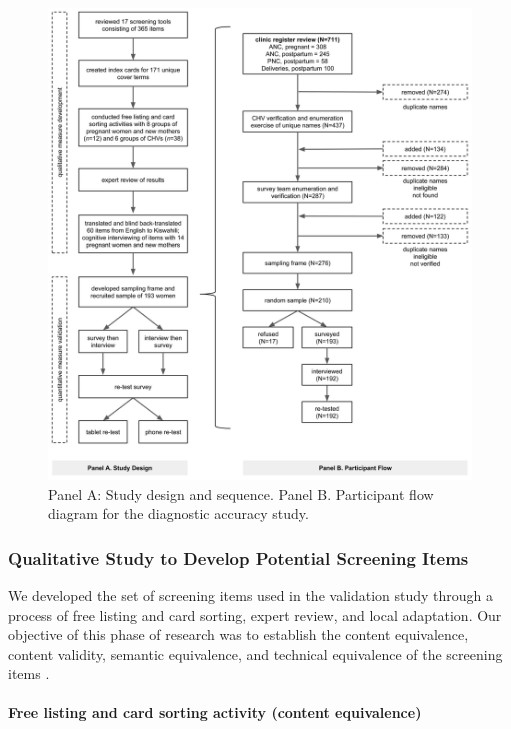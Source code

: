 \documentclass[man,natbib,longtable]{apa6}\usepackage[]{graphicx}\usepackage[]{color}
\begin{document}
\begin{figure}[H]
\centering
\includegraphics[scale=.8]{figures/designandflow.pdf}
\caption{Panel A: Study design and sequence. Panel B. Participant flow diagram for the diagnostic accuracy study.}
\label{flow}
\end{figure}

\subsubsection{Qualitative Study to Develop Potential Screening Items}

We developed the set of screening items used in the validation study through a process of free listing and card sorting, expert review, and local adaptation. Our objective of this phase of research was to establish the content equivalence, content validity, semantic equivalence, and technical equivalence of the screening items \citep{Kohrt:2011}.

\paragraph{Free listing and card sorting activity (content equivalence)}
\end{document}
